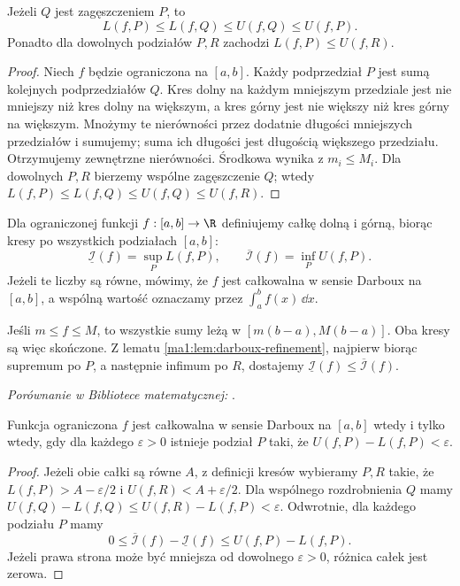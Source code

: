 \begin{lemat}
\label{ma1:lem:darboux-refinement}
Jeżeli $Q$ jest zagęszczeniem $P$, to
\[
 L(f,P)\le L(f,Q)\le U(f,Q)\le U(f,P).
\]
Ponadto dla dowolnych podziałów $P,R$ zachodzi $L(f,P)\le U(f,R)$.
\end{lemat}
\begin{proof}
Niech $f$ będzie ograniczona na $[a,b]$. Każdy podprzedział $P$ jest sumą kolejnych podprzedziałów $Q$. Kres dolny na każdym mniejszym przedziale jest nie mniejszy niż kres dolny na większym, a kres górny jest nie większy niż kres górny na większym. Mnożymy te nierówności przez dodatnie długości mniejszych przedziałów i sumujemy; suma ich długości jest długością większego przedziału. Otrzymujemy zewnętrzne nierówności. Środkowa wynika z $m_i\le M_i$. Dla dowolnych $P,R$ bierzemy wspólne zagęszczenie $Q$; wtedy $L(f,P)\le L(f,Q)\le U(f,Q)\le U(f,R)$.
\end{proof}
\begin{definicja}
\label{ma1:def:riemann-integral}
Dla ograniczonej funkcji $f:[a,b]\to\R$ definiujemy całkę dolną i górną, biorąc kresy po wszystkich podziałach $[a,b]$:
\[
 \underline{\mathcal I}(f)=\sup_P L(f,P),\qquad
 \overline{\mathcal I}(f)=\inf_P U(f,P).
\]
Jeżeli te liczby są równe, mówimy, że $f$ jest całkowalna w sensie Darboux na $[a,b]$, a wspólną wartość oznaczamy przez $\int_a^b f(x)\,\dd x$.
\end{definicja}
Jeśli $m\le f\le M$, to wszystkie sumy leżą w $[m(b-a),M(b-a)]$. Oba kresy są więc skończone. Z lematu \ref{ma1:lem:darboux-refinement}, najpierw biorąc supremum po $P$, a następnie infimum po $R$, dostajemy $\underline{\mathcal I}(f)\le\overline{\mathcal I}(f)$.

\noindent\emph{Porównanie w Bibliotece matematycznej:} .

\begin{twierdzenie}
\label{ma1:thm:darboux-criterion}
Funkcja ograniczona $f$ jest całkowalna w sensie Darboux na $[a,b]$ wtedy i tylko wtedy, gdy dla każdego $\varepsilon>0$ istnieje podział $P$ taki, że $U(f,P)-L(f,P)<\varepsilon$.
\end{twierdzenie}
\begin{proof}
Jeżeli obie całki są równe $A$, z definicji kresów wybieramy $P,R$ takie, że $L(f,P)>A-\varepsilon/2$ i $U(f,R)<A+\varepsilon/2$. Dla wspólnego rozdrobnienia $Q$ mamy $U(f,Q)-L(f,Q)\le U(f,R)-L(f,P)<\varepsilon$. Odwrotnie, dla każdego podziału $P$ mamy
\[
 0\le\overline{\mathcal I}(f)-\underline{\mathcal I}(f)
 \le U(f,P)-L(f,P).
\]
Jeżeli prawa strona może być mniejsza od dowolnego $\varepsilon>0$, różnica całek jest zerowa.
\end{proof}

